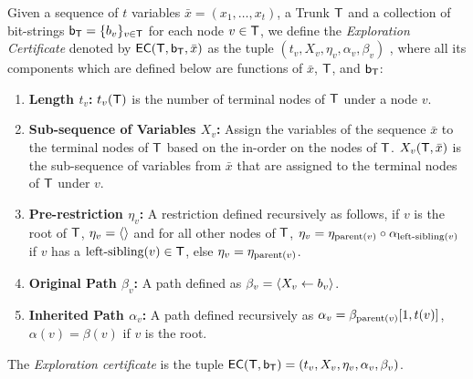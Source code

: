 \begin{definition}
\label{def:draft-certificate}
Given a sequence of $t$ variables $\bar{x} = (x_1, \dots , x_t)$, a Trunk $\mathsf{T}$ and a collection of bit-strings $\mathsf{b_T} = \{b_v\}_{v \in \mathsf{T}}$ for each node $v \in \mathsf{T}$, we define the \emph{Exploration Certificate} denoted by $\mathsf{EC}(\mathsf{T}, \mathsf{b_T},\bar{x})$ as the tuple $(t_v, X_v, \eta_v, \alpha_v, \beta_v)$ , where all its components which are defined below are functions of $\bar{x}$, $\mathsf{T}$, and $\mathsf{b_T}$:
\begin{enumerate}
    \item \textbf{Length $t_v$:} $t_v(\mathsf{T})$ is the number of terminal nodes of $\mathsf{T}$ under a node $v$.
    \item \textbf{Sub-sequence of Variables $X_v$:} Assign the variables of the sequence $\bar{x}$ to the terminal nodes of $\mathsf{T}$ based on the in-order on the nodes of $\mathsf{T}$. 
    $X_v(\mathsf{T}, \bar{x})$ is the sub-sequence of variables from $\bar{x}$ that are assigned to the terminal nodes of $\mathsf{T}$ under $v$.
    \item \textbf{Pre-restriction $\eta_v$:} A restriction defined recursively as follows, 
    if $v$ is the root of $\mathsf{T}$, $\eta_v = \left\langle  \right\rangle$ and for all other nodes of $\mathsf{T}$,
    $\eta_v = \eta_{\operatorname{\text{parent}}(v)} \circ \alpha_{\operatorname{\text{left-sibling}}(v)}$ if $v$ has a $\operatorname{\text{left-sibling}}(v) \in \mathsf{T}$, else $\eta_v = \eta_{\operatorname{\text{parent}}(v)}$.  
    \item \textbf{Original Path $\beta_v$:} A path defined as $\beta_v = \left\langle X_v \gets b_v \right\rangle$.
    \item \textbf{Inherited Path $\alpha_v$:} A path defined recursively as $\alpha_v = \beta_{\operatorname{\text{parent}}(v)}[1,t(v)]$, $\alpha(v) = \beta(v)$ if $v$ is the root. 
\end{enumerate}
The \emph{Exploration certificate} is the tuple $\mathsf{EC}(\mathsf{T}, \mathsf{b_T}) = (t_v, X_v, \eta_v, \alpha_v, \beta_v)$.
\end{definition}

